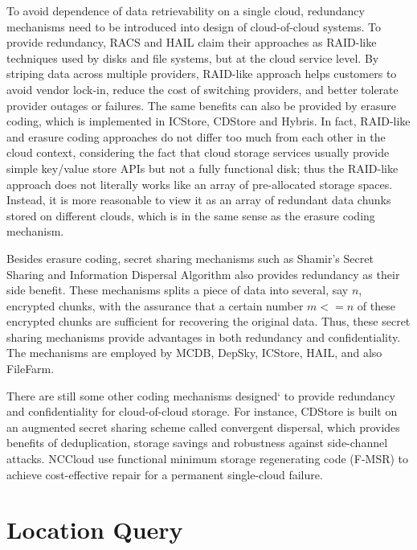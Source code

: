 To avoid dependence of data retrievability on a single cloud, redundancy mechanisms need to be introduced into design of cloud-of-cloud systems. To provide redundancy, RACS\cite{abu2010racs} and HAIL\cite{bowers2009hail} claim their approaches as RAID-like techniques used by disks and file systems, but at the cloud service level. By striping data across multiple providers, RAID-like approach helps customers to avoid vendor lock-in, reduce the cost of switching providers, and better tolerate provider outages or failures. The same benefits can also be provided by erasure coding, which is implemented in ICStore\cite{cachin2010dependable}, CDStore\cite{li2015cdstore} and Hybris\cite{dobre2014hybris}. In fact, RAID-like and erasure coding approaches do not differ too much from each other in the cloud context, considering the fact that cloud storage services usually provide simple key/value store APIs but not a fully functional disk; thus the RAID-like approach does not literally works like an array of pre-allocated storage spaces. Instead, it is more reasonable to view it as an array of redundant data chunks stored on different clouds, which is in the same sense as the erasure coding mechanism.

Besides erasure coding, secret sharing mechanisms such as Shamir's Secret Sharing\cite{shamir1979share} and Information Dispersal Algorithm\cite{rabin1989efficient} also provides redundancy as their side benefit. These mechanisms splits a piece of data into several, say $n$, encrypted chunks, with the assurance that a certain number $m <= n$ of these encrypted chunks are sufficient for recovering the original data. Thus, these secret sharing mechanisms provide advantages in both redundancy and confidentiality. The mechanisms are employed by MCDB\cite{alzain2011mcdb}, DepSky\cite{bessani2013depsky}, ICStore\cite{cachin2010dependable}, HAIL\cite{bowers2009hail}, and also FileFarm.

There are still some other coding mechanisms designed` to provide redundancy and confidentiality for cloud-of-cloud storage. For instance, CDStore\cite{li2015cdstore} is built on an augmented secret sharing scheme called convergent dispersal, which provides benefits of deduplication, storage savings and robustness against side-channel attacks. NCCloud\cite{hu2012nccloud} use functional minimum storage regenerating code (F-MSR) to achieve cost-effective repair for a permanent single-cloud failure.

\newpage

\section{Location Query}
\label{ss:coclocationquery}

